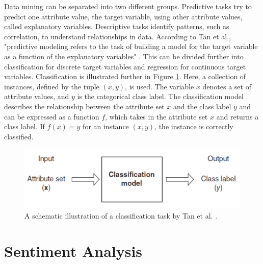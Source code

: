 Data mining can be separated into two different groups. Predictive tasks try to predict one attribute value, the target variable, using other attribute values, called explanatory variables. Descriptive tasks identify patterns, such as correlation, to understand relationships in data. According to Tan et al., "predictive modeling refers to the task of building a model for the target variable as a function of the explanatory variables" \cite[p.~29]{DBLP:books/aw/TanSKK2019}. This can be divided further into classification for discrete target variables and regression for continuous target variables. Classification is illustrated further in Figure \ref{fig:classifiation}. Here, a collection of instances, defined by the tuple $(x,y)$, is used. The variable $x$ denotes a set of attribute values, and $y$ is the categorical class label. The classification model describes the relationship between the attribute set $x$ and the class label $y$ and can be expressed as a function $f$, which takes in the attribute set $x$ and returns a class label. If $f(x) = y$ for an instance $(x,y)$, the instance is correctly classified.
\begin{figure}
    \centering
    \includegraphics[scale = 0.6]{Images/classification.png}
    \caption{A schematic illustration of a classification task by Tan et al. \cite[p.~134]{DBLP:books/aw/TanSKK2019}.}
    \label{fig:classifiation}
\end{figure}



\section{Sentiment Analysis}


